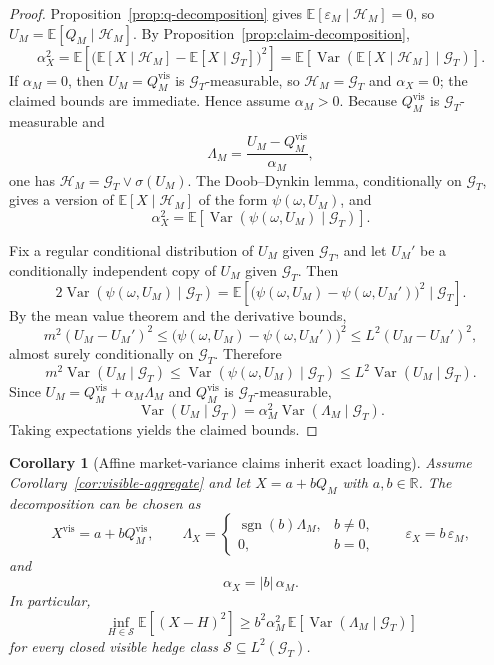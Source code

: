 \documentclass[11pt,a4paper]{amsart}
\theoremstyle{plain}
\newtheorem{corollary}[theorem]{Corollary}
\theoremstyle{definition}
\theoremstyle{remark}
\DeclareMathOperator{\Var}{Var}
\newcommand{\R}{\mathbb{R}}
\newcommand{\EE}{\mathbb{E}}
\newcommand{\cH}{\mathcal{H}}
\newcommand{\cG}{\mathcal{G}}
\begin{document}
\begin{proof}
Proposition~\ref{prop:q-decomposition} gives \(\EE[\varepsilon_M\mid \cH_M]=0\), so
\(U_M=\EE[Q_M\mid\cH_M]\).  By Proposition~\ref{prop:claim-decomposition},
\[
        \alpha_X^2
        =
        \EE\!\left[\bigl(\EE[X\mid \cH_M]-\EE[X\mid \cG_T]\bigr)^2\right]
        =
        \EE\!\left[\Var(\EE[X\mid \cH_M]\mid \cG_T)\right].
\]
If \(\alpha_M=0\), then \(U_M=Q_M^{\mathrm{vis}}\) is \(\cG_T\)-measurable, so
\(\cH_M=\cG_T\) and \(\alpha_X=0\); the claimed bounds are immediate.  Hence assume
\(\alpha_M>0\).  Because \(Q_M^{\mathrm{vis}}\) is \(\cG_T\)-measurable and
\[
        \Lambda_M=\frac{U_M-Q_M^{\mathrm{vis}}}{\alpha_M},
\]
one has \(\cH_M=\cG_T\vee \sigma(U_M)\).  The Doob--Dynkin lemma, conditionally on
\(\cG_T\), gives a version of \(\EE[X\mid \cH_M]\) of the form \(\psi(\omega,U_M)\), and
\[
        \alpha_X^2
        =
        \EE\!\left[\Var(\psi(\omega,U_M)\mid \cG_T)\right].
\]

Fix a regular conditional distribution of \(U_M\) given \(\cG_T\), and let \(U_M'\) be a
conditionally independent copy of \(U_M\) given \(\cG_T\).  Then
\[
        2\Var(\psi(\omega,U_M)\mid \cG_T)
        =
        \EE\!\left[\bigl(\psi(\omega,U_M)-\psi(\omega,U_M')\bigr)^2\mid \cG_T\right].
\]
By the mean value theorem and the derivative bounds,
\[
        m^2(U_M-U_M')^2
        \le
        \bigl(\psi(\omega,U_M)-\psi(\omega,U_M')\bigr)^2
        \le
        L^2(U_M-U_M')^2,
\]
almost surely conditionally on \(\cG_T\).  Therefore
\[
        m^2\Var(U_M\mid \cG_T)
        \le
        \Var(\psi(\omega,U_M)\mid \cG_T)
        \le
        L^2\Var(U_M\mid \cG_T).
\]
Since \(U_M=Q_M^{\mathrm{vis}}+\alpha_M\Lambda_M\) and \(Q_M^{\mathrm{vis}}\) is
\(\cG_T\)-measurable,
\[
        \Var(U_M\mid \cG_T)=\alpha_M^2\Var(\Lambda_M\mid \cG_T).
\]
Taking expectations yields the claimed bounds.
\end{proof}

\begin{corollary}[Affine market-variance claims inherit exact loading]\label{cor:affine-loading}
Assume Corollary~\ref{cor:visible-aggregate} and let \(X=a+bQ_M\) with \(a,b\in\R\).  The
decomposition can be chosen as
\[
        X^{\mathrm{vis}}=a+bQ_M^{\mathrm{vis}},
        \qquad
        \Lambda_X=
        \begin{cases}
                \operatorname{sgn}(b)\Lambda_M, & b\neq0,\\
                0, & b=0,
        \end{cases}
        \qquad
        \varepsilon_X=b\,\varepsilon_M,
\]
and
\[
        \alpha_X=|b|\,\alpha_M.
\]
In particular,
\[
        \inf_{H\in \mathcal S}\EE[(X-H)^2]
        \ge
        b^2\alpha_M^2\,\EE[\Var(\Lambda_M\mid \cG_T)]
\]
for every closed visible hedge class \(\mathcal S\subseteq L^2(\cG_T)\).
\end{corollary}
\end{document}
